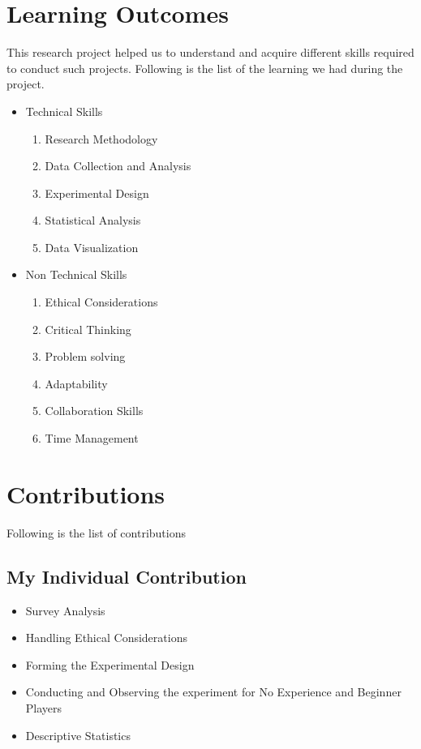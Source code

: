 \documentclass[conference]{IEEEtran}
\begin{document}
\section{Learning Outcomes}
This research project helped us to understand and acquire different skills required to conduct such projects. Following is the list of the learning we had during the project.
\begin{itemize}
  \item Technical Skills
  \begin{enumerate}
      \item Research Methodology
      \item Data Collection and Analysis
      \item Experimental Design
      \item Statistical Analysis
      \item Data Visualization
  \end{enumerate}
  \item Non Technical Skills
  \begin{enumerate}
      \item Ethical Considerations
      \item Critical Thinking
      \item Problem solving
      \item Adaptability
      \item Collaboration Skills
      \item Time Management
  \end{enumerate}
\end{itemize}
\section{Contributions}
Following is the list of contributions

\subsection{My Individual Contribution}
\begin{itemize}
    \item Survey Analysis
    \item Handling Ethical Considerations
    \item Forming the Experimental Design
    \item Conducting and Observing the experiment for No Experience and Beginner Players
    \item Descriptive Statistics
\end{itemize}
\end{document}
